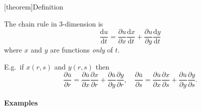 \documentclass[12pt]{report}
\theoremstyle{definition}
\begin{document}
[theorem]{Definition}
\begin{the chain rule}
    The chain rule in 3-dimension is\[
        \frac{\mathrm{d}u}{\mathrm{d}t} = \frac{\partial u}{\partial x} 
        \frac{\mathrm{d}x}{\mathrm{d}t} + \frac{\partial u}{\partial y} \frac{\mathrm{d}y}{\mathrm{d}t} 
    \]where $x$ and $y$ are functions \emph{only} of $t$.
\end{the chain rule}

E.g.\ if $x(r,s)$ and $y(r,s)$ then\[
    \frac{\partial \overline{u}}{\partial r} = \frac{\partial \overline{u}}{\partial x} 
    \frac{\partial x}{\partial r} + \frac{\partial \overline{u}}{\partial y} \frac{\partial y}{\partial r},\quad
    \frac{\partial \overline{u}}{\partial s} = \frac{\partial \overline{u}}{\partial x}
    \frac{\partial x}{\partial s} + \frac{\partial \overline{u}}{\partial y} \frac{\partial y}{\partial s}.
\]

\paragraph{Examples}
\,
\end{document}
